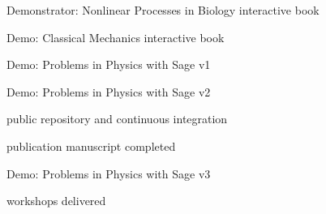 \begin{workpackage}[id=dissem,wphases=18-48!.5,
  title=Dissemination,
  SARM=1,
  USORM=10,
  USHRM=8,
  USRM=24
]
\begin{wpdelivs}
 \begin{wpdeliv}[due=36,id=ibook2,dissem=PU,nature=DEM]{Demonstrator: Nonlinear Processes in Biology  interactive book} \end{wpdeliv}

 \begin{wpdeliv}[due=40,id=ibook2,dissem=PU,nature=DEM]{Demo: Classical Mechanics interactive book} \end{wpdeliv}

 \begin{wpdeliv}[due=12,id=ibook3a,dissem=PU,nature=DEM]{Demo: Problems in Physics with Sage v1} \end{wpdeliv}
 \begin{wpdeliv}[due=30,id=ibook3b,dissem=PU,nature=DEM]{Demo: Problems in Physics with Sage v2} \end{wpdeliv}
 \begin{wpdeliv}[due=32,id=oommfnb-source-and-testing-setup,dissem=PU,nature=DEC]{\OOMMFNB{} public
     repository and
     continuous integration} \end{wpdeliv}
 \begin{wpdeliv}[due=36,id=oommfnb-publication,dissem=PU,nature=R]{\OOMMFNB{}
     publication manuscript completed} \end{wpdeliv}
 \begin{wpdeliv}[due=44,id=ibook3c,dissem=PU,nature=DEM]{Demo: Problems in Physics with Sage v3} \end{wpdeliv}
 \begin{wpdeliv}[due=42,id=oommfnb-workshops,dissem=PU,nature=O]{\OOMMFNB{}
     workshops delivered} \end{wpdeliv}
\end{wpdelivs}


\end{workpackage}


